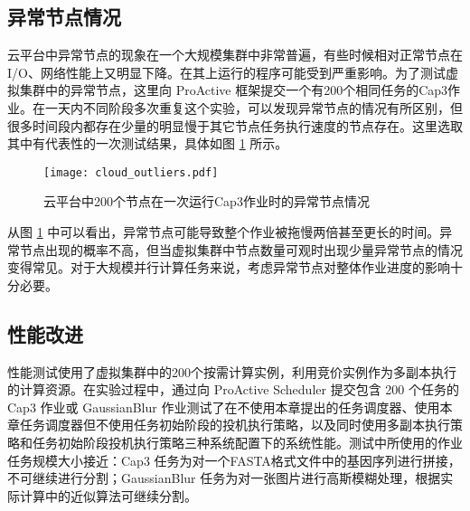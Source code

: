 \subsection{异常节点情况}
\label{sec:no2_overhead}
云平台中异常节点的现象在一个大规模集群中非常普遍，有些时候相对正常节点在I/O、网络性能上又明显下降。在其上运行的程序可能受到严重影响。为了测试虚拟集群中的异常节点，这里向 ProActive 框架提交一个有200个相同任务的Cap3作业。在一天内不同阶段多次重复这个实验，可以发现异常节点的情况有所区别，但很多时间段内都存在少量的明显慢于其它节点任务执行速度的节点存在。这里选取其中有代表性的一次测试结果，具体如图 \ref{figure:outlier_cloud} 所示。
\begin{figure}
  \centering
  \texttt{[image: cloud\_outliers.pdf]}
  \caption{云平台中200个节点在一次运行Cap3作业时的异常节点情况}
  \label{figure:outlier_cloud}
\end{figure}

从图 \ref{figure:outlier_cloud} 中可以看出，异常节点可能导致整个作业被拖慢两倍甚至更长的时间。异常节点出现的概率不高，但当虚拟集群中节点数量可观时出现少量异常节点的情况变得常见。对于大规模并行计算任务来说，考虑异常节点对整体作业进度的影响十分必要。

\subsection{性能改进}
\label{sec:no2_perf}
性能测试使用了虚拟集群中的200个按需计算实例，利用竞价实例作为多副本执行的计算资源。在实验过程中，通过向 ProActive Scheduler 提交包含 200 个任务的 Cap3 作业或 GaussianBlur 作业测试了在不使用本章提出的任务调度器、使用本章任务调度器但不使用任务初始阶段的投机执行策略，以及同时使用多副本执行策略和任务初始阶段投机执行策略三种系统配置下的系统性能。测试中所使用的作业任务规模大小接近：Cap3 任务为对一个FASTA格式文件中的基因序列进行拼接，不可继续进行分割；GaussianBlur 任务为对一张图片进行高斯模糊处理，根据实际计算中的近似算法可继续分割。


